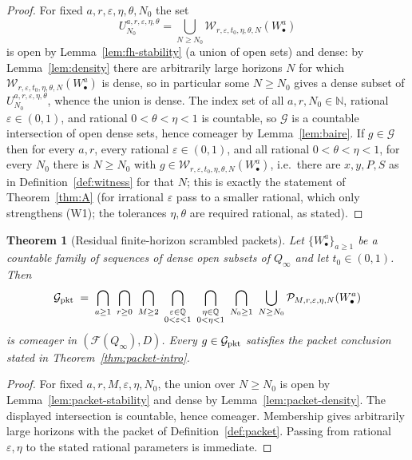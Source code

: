 \documentclass[11pt]{article}
\newtheorem{theorem}{Theorem}[section]
\newcommand{\Q}{Q_\infty}
\newcommand{\F}{\mathcal{F}}
\newcommand{\W}{\mathcal{W}}
\newcommand{\Gcal}{\mathcal{G}}
\begin{document}
\begin{proof}
For fixed \(a,r,\varepsilon,\eta,\theta,N_0\) the set
\[
U^{a,r,\varepsilon,\eta,\theta}_{N_0}
=\bigcup_{N\ge N_0}\W_{r,\varepsilon,t_0,\eta,\theta,N}(W^a_\bullet)
\]
is open by Lemma~\ref{lem:fh-stability} (a union of open sets) and dense: by
Lemma~\ref{lem:density} there are arbitrarily large horizons $N$ for which
\(\W_{r,\varepsilon,t_0,\eta,\theta,N}(W^a_\bullet)\) is dense, so in particular some
\(N\ge N_0\) gives a dense subset of \(U^{a,r,\varepsilon,\eta,\theta}_{N_0}\), whence
the union is dense.  The index set of all \(a,r,N_0\in\mathbb N\), rational
\(\varepsilon\in(0,1)\), and rational \(0<\theta<\eta<1\) is countable, so \(\Gcal\) is
a countable intersection of open dense sets, hence comeager
by Lemma~\ref{lem:baire}.  If $g\in\Gcal$ then for every $a,r$, every rational
\(\varepsilon\in(0,1)\), and all rational \(0<\theta<\eta<1\), for every \(N_0\) there
is \(N\ge N_0\) with
\(g\in\W_{r,\varepsilon,t_0,\eta,\theta,N}(W^a_\bullet)\), i.e.\ there are
$x,y,P,S$ as in Definition~\ref{def:witness} for that $N$; this is exactly the statement
of Theorem~\ref{thm:A} (for irrational $\varepsilon$ pass to a smaller rational, which
only strengthens (W1); the tolerances \(\eta,\theta\) are required rational, as stated).
\end{proof}

\begin{theorem}[Residual finite-horizon scrambled packets]\label{thm:packet}
Let $\{W^a_\bullet\}_{a\ge1}$ be a countable family of sequences of dense open subsets
of $\Q$ and let \(t_0\in(0,1)\).  Then
\[
\Gcal_{\rm pkt}
\;=\;
\bigcap_{a\ge1}\ \bigcap_{r\ge0}\ \bigcap_{M\ge2}\
\bigcap_{\substack{\varepsilon\in\mathbb Q\\0<\varepsilon<1}}\
\bigcap_{\substack{\eta\in\mathbb Q\\0<\eta<1}}\
\bigcap_{N_0\ge1}\ \bigcup_{N\ge N_0}
\mathcal P_{M,r,\varepsilon,\eta,N}(W^a_\bullet)
\]
is comeager in \((\F(\Q),D)\).  Every \(g\in\Gcal_{\rm pkt}\) satisfies the
packet conclusion stated in Theorem~\ref{thm:packet-intro}.
\end{theorem}

\begin{proof}
For fixed \(a,r,M,\varepsilon,\eta,N_0\), the union over \(N\ge N_0\) is open by
Lemma~\ref{lem:packet-stability} and dense by Lemma~\ref{lem:packet-density}.
The displayed intersection is countable, hence comeager.  Membership gives
arbitrarily large horizons with the packet of Definition~\ref{def:packet}.  Passing
from rational \(\varepsilon,\eta\) to the stated rational parameters is immediate.
\end{proof}
\end{document}

